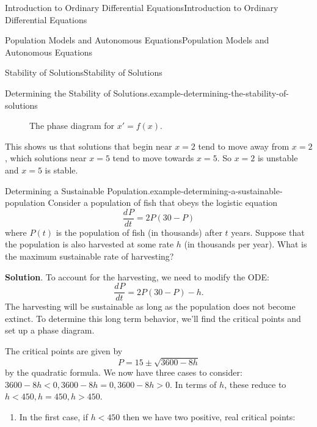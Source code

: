 \documentclass[10pt,]{book}
\numberwithin{equation}{section}
\newcommand{\dv}[3][]{\dfrac{d^{#1} #2}{d #3^{#1}}}
\newcommand{\lt}{<}
\newcommand{\gt}{>}
\begin{document}
\begin{chapterptx}{Introduction to Ordinary Differential Equations}{}{Introduction to Ordinary Differential Equations}{}{}
\begin{sectionptx}{Population Models and Autonomous Equations}{}{Population Models and Autonomous Equations}{}{}
\begin{subsectionptx}{Stability of Solutions}{}{Stability of Solutions}{}{}
\begin{example}{Determining the Stability of Solutions.}{example-determining-the-stability-of-solutions}
\begin{figure}
{
}
\caption{The phase diagram for \(x' = f(x).\)\label{figure-7}}
\end{figure}
\hypertarget{p-127}{}%
This shows us that solutions that begin near \(x = 2\) tend to move away from \(x = 2\), which solutions near \(x = 5\) tend to move towards \(x = 5\). So \(x = 2\) is unstable and \(x = 5\) is stable.%
\end{example}
\begin{example}{Determining a Sustainable Population.}{example-determining-a-sustainable-population}%
\hypertarget{p-128}{}%
Consider a population of fish that obeys the logistic equation%
\begin{equation*}
\dv{P}{t} = 2P(30 - P)
\end{equation*}
where \(P(t)\) is the population of fish (in thousands) after \(t\) years. Suppose that the population is also harvested at some rate \(h\) (in thousands per year). What is the maximum sustainable rate of harvesting?%
\par\smallskip%
\noindent\textbf{Solution}.\hypertarget{solution-22}{}\quad%
\hypertarget{p-129}{}%
To account for the harvesting, we need to modify the ODE:%
\begin{equation*}
\dv{P}{t} = 2P(30 - P) - h.
\end{equation*}
The harvesting will be sustainable as long as the population does not become extinct. To determine this long term behavior, we'll find the critical points and set up a phase diagram.%
\par
\hypertarget{p-130}{}%
The critical points are given by%
\begin{equation*}
P = 15 \pm \sqrt{3600 - 8h}
\end{equation*}
by the quadratic formula. We now have three cases to consider: \(3600 - 8h \lt 0, 3600 - 8h = 0, 3600 - 8h \gt 0.\) In terms of \(h\), these reduce to \(h \lt 450, h = 450, h \gt 450\).%
\leavevmode%
\begin{enumerate}
\item\hypertarget{li-11}{}\hypertarget{p-131}{}%
In the first case, if \(h \lt 450\) then we have two positive, real critical points:%

\end{enumerate}
\end{example}
\end{subsectionptx}
\end{sectionptx}
\end{chapterptx}
\end{document}
